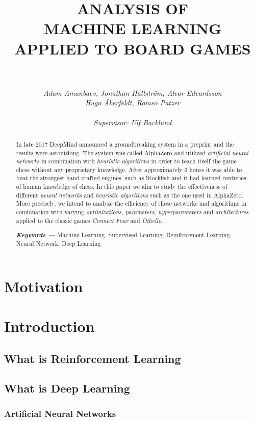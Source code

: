 \documentclass[titlepage]{article}
\title{
    \textbf{ANALYSIS OF \\
    MACHINE LEARNING \\
    APPLIED TO BOARD GAMES}
}
\author{
    \rule{8cm}{0.3mm} \\[0.5in] 
    \textit{Adam Amanbaev, Jonathan Hallström, Alvar Edvardsson} \\ 
    \textit{Hugo Åkerfeldt, Romeo Patzer} \\\\
    \small \textit{Supervisor: Ulf Backlund}
}
\date{}
\providecommand{\keywords}[1] {
    \small
    \textbf{\textit{Keywords ---}} #1
}
\begin{document}
\maketitle

\newpage

\begin{abstract}
    In late 2017 DeepMind announced a groundbreaking system in a preprint \cite{alphazero} and the results were astonishing. The system was called AlphaZero and utilized \emph{artificial neural networks} in combination with \emph{heuristic algorithms} in order to teach itself the game chess without any proprietary knowledge. After approximately 9 hours it was able to beat the strongest hand-crafted engines, such as Stockfish and it had learned centuries of human knowledge of chess. In this paper we aim to study the effectiveness of different \emph{neural networks} and \emph{heuristic algorithms} such as the one used in AlphaZero. More precisely, we intend to analyze the efficiency of those networks and algorithms in combination with varying \emph{optimizations, parameters, hyperparameters} and \emph {architectures} applied to the classic games \emph{Connect Four} and \emph{Othello}. \\[0.5in]
\centerline{\keywords{Machine Learning, Supervised Learning, Reinforcement Learning, Neural Network, Deep Learning}}
\end{abstract}

\tableofcontents

\newpage

\section{Motivation}

\newpage

\section{Introduction}

\subsection{What is Reinforcement Learning}
\subsection{What is Deep Learning}
\subsubsection{Artificial Neural Networks}
\end{document}
